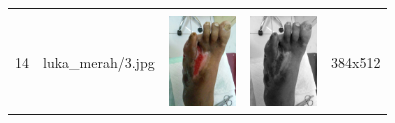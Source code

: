 \begin{table}[H]
\begin{tabular}{|m{0.2in}|m{1.2in}|m{0.7in}|m{0.7in}|m{0.7in}|}
		& &  &  &\\
		14& 
		luka\_merah/3.jpg &
		\includegraphics[width=0.7in]{dataset/dataset_3/luka_merah/ready/3.jpg}&
		\includegraphics[width=0.7in]{dataset/dataset_3/luka_merah/ready/3_gray.jpg}&
		384x512\\
		\hline
	\end{tabular}
\end{table}

